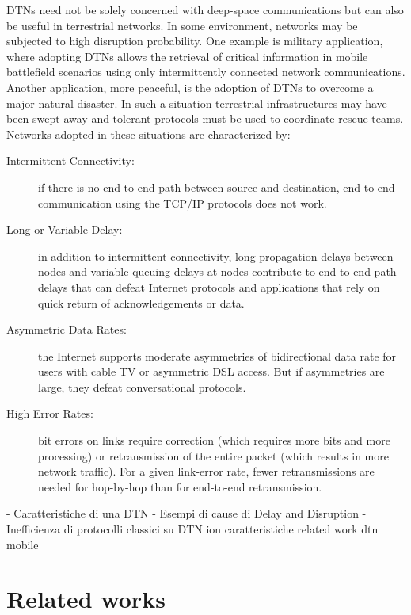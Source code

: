 DTNs need not be solely concerned with deep-space communications but can also be useful in terrestrial networks. In some environment, networks may be subjected to high disruption probability. One example is military application, where adopting DTNs allows the retrieval of critical information in mobile battlefield scenarios using only intermittently connected network communications. Another application, more peaceful, is the adoption of DTNs to overcome a major natural disaster. In such a situation terrestrial infrastructures may have been swept away and tolerant protocols must be used to coordinate rescue teams.  
\\

Networks adopted in these situations are characterized by:
\begin{description}
\item[Intermittent Connectivity:] if there is no end-to-end path between source and destination, end-to-end communication using the TCP/IP protocols does not work.
\item[Long or Variable Delay:] in addition to intermittent connectivity, long propagation delays between nodes and variable queuing delays at nodes contribute to end-to-end path delays that can defeat Internet protocols and applications that rely on quick return of acknowledgements or data.
\item[Asymmetric Data Rates:] the Internet supports moderate asymmetries of bidirectional data rate for users with cable TV or asymmetric DSL access. But if asymmetries are large, they defeat conversational protocols.
\item[High Error Rates:] bit errors on links require correction (which requires more bits and more processing) or retransmission of the entire packet (which results in more network traffic). For a given link-error rate, fewer retransmissions are needed for hop-by-hop than for end-to-end retransmission.
\end{description}

 
 
 
 


- Caratteristiche di una DTN 
   - Esempi di cause di Delay and Disruption
   - Inefficienza di protocolli classici su DTN ion caratteristiche
related work dtn mobile


\section{Related works}

